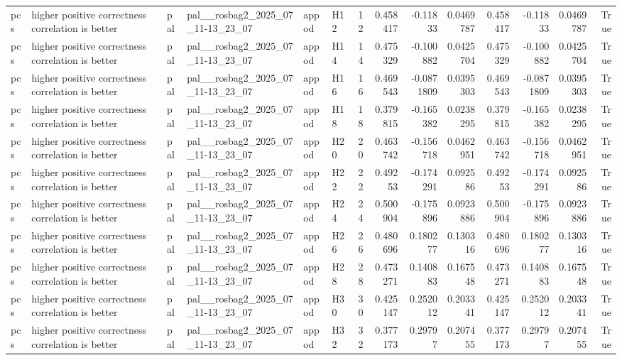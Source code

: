 \begin{longtable}{llllllrrrrrrrr}
pcs & higher positive correctness correlation is better & pal & pal\_\_rosbag2\_2025\_07\_11-13\_23\_07 & appod & H12 & 12 & 0.458417 & -0.11833 & 0.0469787 & 0.458417 & -0.11833 & 0.0469787 & True \\
pcs & higher positive correctness correlation is better & pal & pal\_\_rosbag2\_2025\_07\_11-13\_23\_07 & appod & H14 & 14 & 0.475329 & -0.100882 & 0.0425704 & 0.475329 & -0.100882 & 0.0425704 & True \\
pcs & higher positive correctness correlation is better & pal & pal\_\_rosbag2\_2025\_07\_11-13\_23\_07 & appod & H16 & 16 & 0.469543 & -0.0871809 & 0.0395303 & 0.469543 & -0.0871809 & 0.0395303 & True \\
pcs & higher positive correctness correlation is better & pal & pal\_\_rosbag2\_2025\_07\_11-13\_23\_07 & appod & H18 & 18 & 0.379815 & -0.165382 & 0.0238295 & 0.379815 & -0.165382 & 0.0238295 & True \\
pcs & higher positive correctness correlation is better & pal & pal\_\_rosbag2\_2025\_07\_11-13\_23\_07 & appod & H20 & 20 & 0.463742 & -0.156718 & 0.0462951 & 0.463742 & -0.156718 & 0.0462951 & True \\
pcs & higher positive correctness correlation is better & pal & pal\_\_rosbag2\_2025\_07\_11-13\_23\_07 & appod & H22 & 22 & 0.49253 & -0.174291 & 0.092586 & 0.49253 & -0.174291 & 0.092586 & True \\
pcs & higher positive correctness correlation is better & pal & pal\_\_rosbag2\_2025\_07\_11-13\_23\_07 & appod & H24 & 24 & 0.500904 & -0.175896 & 0.0923886 & 0.500904 & -0.175896 & 0.0923886 & True \\
pcs & higher positive correctness correlation is better & pal & pal\_\_rosbag2\_2025\_07\_11-13\_23\_07 & appod & H26 & 26 & 0.480696 & 0.180277 & 0.130316 & 0.480696 & 0.180277 & 0.130316 & True \\
pcs & higher positive correctness correlation is better & pal & pal\_\_rosbag2\_2025\_07\_11-13\_23\_07 & appod & H28 & 28 & 0.473271 & 0.140883 & 0.167548 & 0.473271 & 0.140883 & 0.167548 & True \\
pcs & higher positive correctness correlation is better & pal & pal\_\_rosbag2\_2025\_07\_11-13\_23\_07 & appod & H30 & 30 & 0.425147 & 0.252012 & 0.203341 & 0.425147 & 0.252012 & 0.203341 & True \\
pcs & higher positive correctness correlation is better & pal & pal\_\_rosbag2\_2025\_07\_11-13\_23\_07 & appod & H32 & 32 & 0.377173 & 0.29797 & 0.207455 & 0.377173 & 0.29797 & 0.207455 & True \\

\end{longtable}
